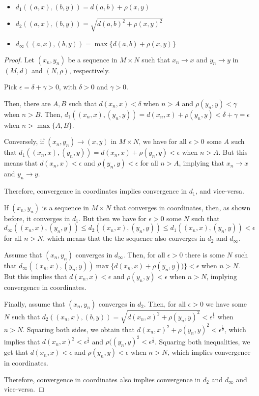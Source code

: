 \begin{itemize}
    \item $d_1((a, x), (b , y)) = d(a, b)+ \rho(x , y)$
    \item  $d_2((a, x), (b , y)) = \sqrt{d(a, b)^2+ \rho(x , y)^2}$
    \item $d_\infty((a, x), (b , y)) = \max\{d(a, b)+ \rho(x , y)\}$
\end{itemize}

\begin{proof}
Let $(x_n, y_n)$ be a sequence in $M \times N$ such that $x_n \rightarrow x$ and $y_n \rightarrow y$ in $(M, d)$ and $(N, \rho)$, respectively.

Pick $\epsilon = \delta + \gamma > 0$, with $\delta > 0$ and $\gamma > 0$.

Then, there are $A, B$ such that $d(x_n, x) < \delta$ when $n>A$ and $\rho(y_n, y) < \gamma$ when $n>B$. Then, $d_1((x_n, x), (y_n, y)) = d(x_n, x) + \rho(y_n, y) < \delta + \gamma = \epsilon$ when $n > \max\{A,B\}$.

Conversely, if $(x_n, y_n) \rightarrow (x,y)$ in $M \times N$, we have for all $\epsilon> 0$  some $A$ such that $d_1((x_n, x), (y_n, y)) = d(x_n, x) + \rho(y_n, y) < \epsilon$ when $n>A$. But this means that  $d(x_n, x) < \epsilon$ and $\rho(y_n, y) < \epsilon$ for all $n>A$, implying that $x_n \rightarrow x$ and $y_n \rightarrow y$.

Therefore, convergence in coordinates implies convergence in $d_1$, and vice-versa.

\vspace{1em}

If $(x_n, y_n)$ is a sequence in $M \times N$ that converges in coordinates, then, as shown before, it converges in $d_1$.  But then we have for $\epsilon>0$ some $N$ such that $d_\infty((x_n, x), (y_n, y)) \leq d_2((x_n, x), (y_n, y)) \leq d_1((x_n, x), (y_n, y)) < \epsilon$ for all $n>N$, which means that the the sequence also converges in $d_2$ and $d_\infty$.

Assume that $(x_n, y_n)$ converges in $d_\infty$. Then, for all $\epsilon >0 $ there is some $N$ such that $d_\infty((x_n, x), (y_n, y))  \max\{d(x_n, x)+ \rho(y_n, y))\} < \epsilon$ when $n>N$. But this implies that $d(x_n, x) < \epsilon$ and $\rho(y_n, y) < \epsilon$ when $n>N$, implying convergence in coordinates.

Finally, assume that $(x_n, y_n)$ converges in $d_2$. Then, for all $\epsilon>0$ we have some $N$ such that $d_2((x_n, x), (b , y)) = \sqrt{d(x_n, x)^2+ \rho(y_n, y)^2} < \epsilon^\frac{1}{4}$ when $n>N$. Squaring both sides, we obtain that $d(x_n, x)^2+ \rho(y_n, y)^2 < \epsilon^\frac{1}{2}$, which implies that $d(x_n, x)^2 < \epsilon^\frac{1}{2}$ and $ \rho((y_n, y)^2 < \epsilon^\frac{1}{2}$. Squaring both inequalities, we get that $d(x_n, x) < \epsilon$ and $\rho(y_n, y) < \epsilon$ when $n>N$, which implies convergence in coordinates.

Therefore, convergence in coordinates also implies convergence in $d_2$ and $d_\infty$ and vice-versa.

\end{proof}


